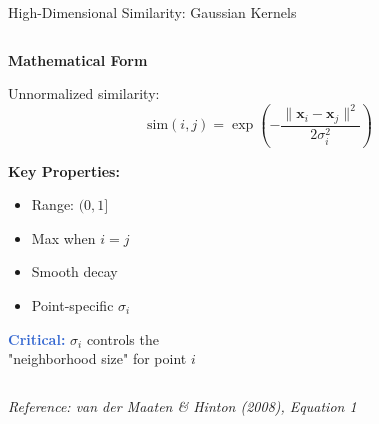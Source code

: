 \documentclass{beamer}
\begin{document}
\begin{frame}{High-Dimensional Similarity: Gaussian Kernels}
\begin{columns}[T]
\begin{column}{0.5\textwidth}
\textbf{\color{upcblue}Mathematical Form}
\vspace{0.2cm}

Unnormalized similarity:
$$\text{sim}(i,j) = \exp\left(-\frac{\|\mathbf{x}_i - \mathbf{x}_j\|^2}{2\sigma_i^2}\right)$$

\vspace{0.3cm}
\textbf{Key Properties:}
\begin{itemize}
    \small
    \item Range: $(0, 1]$
    \item Max when $i = j$
    \item Smooth decay
    \item Point-specific $\sigma_i$
\end{itemize}

\vspace{0.2cm}
\small
\textcolor{highlight}{\textbf{Critical:}} $\sigma_i$ controls the\\
"neighborhood size" for point $i$
\end{column}
\end{columns}

\vspace{0.3cm}
\begin{center}
\colorbox{upcblue!10}{
\begin{minipage}{0.85\textwidth}
\centering
\footnotesize\textit{Reference: van der Maaten \& Hinton (2008), Equation 1}
\end{minipage}
}
\end{center}
\end{frame}
\end{document}
